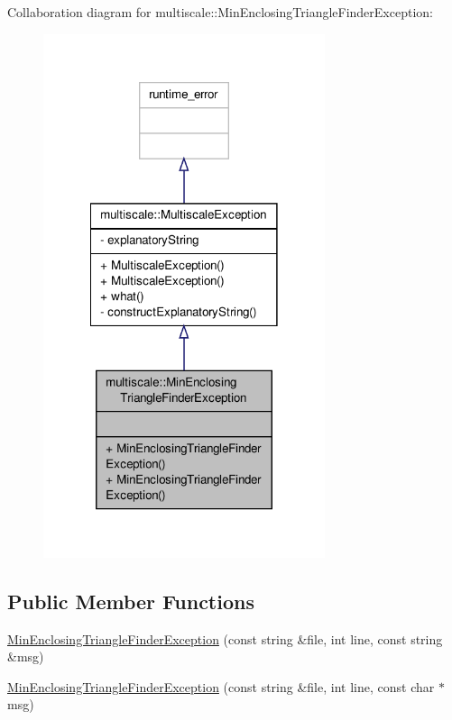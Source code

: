 Collaboration diagram for multiscale\-:\-:Min\-Enclosing\-Triangle\-Finder\-Exception\-:
\nopagebreak
\begin{figure}[H]
\begin{center}
\leavevmode
\includegraphics[width=234pt]{classmultiscale_1_1MinEnclosingTriangleFinderException__coll__graph}
\end{center}
\end{figure}
\subsection*{Public Member Functions}
\begin{DoxyCompactItemize}
\item 
\hyperlink{classmultiscale_1_1MinEnclosingTriangleFinderException_a5e557314d6e619be66b5c348890e27ff}{Min\-Enclosing\-Triangle\-Finder\-Exception} (const string \&file, int line, const string \&msg)
\item 
\hyperlink{classmultiscale_1_1MinEnclosingTriangleFinderException_a7ff2a8391032f1204050c784f2a61849}{Min\-Enclosing\-Triangle\-Finder\-Exception} (const string \&file, int line, const char $\ast$msg)
\end{DoxyCompactItemize}


